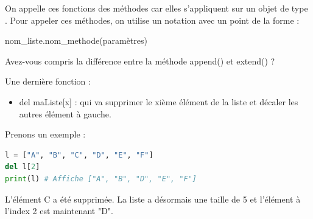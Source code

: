 \begin{Astuce}
On appelle ces fonctions des méthodes car elles s'appliquent sur un objet de type . Pour appeler ces méthodes, on utilise un notation avec un point de la forme :
\begin{center}
nom\_liste.nom\_methode(paramètres) 
\end{center}
\end{Astuce}



\begin{Comprendre}
    Avez-vous compris la différence entre la méthode append() et extend() ?
    \vspace{1cm}
\end{Comprendre}

Une dernière fonction :
\begin{itemize}
    \item del maListe[x] : qui va supprimer le xième élément de la liste et décaler les autres élément à gauche.
\end{itemize}
Prenons un exemple :
\begin{lstlisting}[style=pythonstyle, language=python]
l = ["A", "B", "C", "D", "E", "F"]
del l[2]
print(l) # Affiche ["A", "B", "D", "E", "F"]
\end{lstlisting}
L'élément C a été supprimée. La liste a désormais une taille de 5 et l'élément à l'index 2 est maintenant "D".


\newpage



